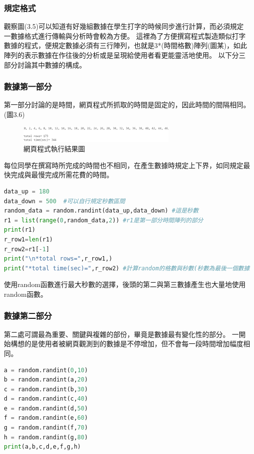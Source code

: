 \subsubsection{規定格式}
觀察圖(3.5)可以知道有好幾組數據在學生打字的時候同步進行計算，而必須規定一數據格式進行傳輸與分析時會較為方便。
這裡為了方便撰寫程式製造類似打字數據的程式，便規定數據必須有三行陣列，也就是3*(時間格數)陣列(圖某)，如此陣列的表示數據在作往後的分析或是呈現給使用者看更能靈活地使用。
以下分三部分討論其中數據的構成。
\subsubsection{數據第一部分}
第一部分討論的是時間，網頁程式所抓取的時間是固定的，因此時間的間隔相同。(圖3.6)
	\begin{figure}[H] %
	\centering %
	\includegraphics[width=0.7\textwidth]{3_2_1_3.png} %
	\caption{網頁程式執行結果圖} %
	\label{Fig.3.6} %
	\end{figure}
每位同學在撰寫時所完成的時間也不相同，在產生數據時規定上下界，如同規定最快完成與最慢完成所需花費的時間。

\begin{lstlisting}[language=Python,caption=python數據第一部分]
data_up = 180
data_down = 500  #可以自行規定秒數區間
random_data = random.randint(data_up,data_down) #這是秒數
r1 = list(range(0,random_data,2)) #r1是第一部分時間陣列的部分
print(r1)
r_row1=len(r1)
r_row2=r1[-1]
print("\n*total rows=",r_row1,)
print("*total time(sec)=",r_row2) #計算random的格數與秒數(秒數為最後一個數據)
\end{lstlisting}
使用random函數進行最大秒數的選擇，後頭的第二與第三數據產生也大量地使用random函數。
\subsubsection{數據第二部分}
第二處可謂最為重要、關鍵與複雜的部份，畢竟是數據最有變化性的部分。
一開始構想的是使用者被網頁觀測到的數據是不停增加，但不會每一段時間增加幅度相同。

\begin{lstlisting}[language=Python,caption=python數據第二部分]
a = random.randint(0,10)
b = random.randint(a,20)
c = random.randint(b,30)
d = random.randint(c,40)
e = random.randint(d,50)
f = random.randint(e,60)
g = random.randint(f,70)
h = random.randint(g,80)
print(a,b,c,d,e,f,g,h)
\end{lstlisting}

